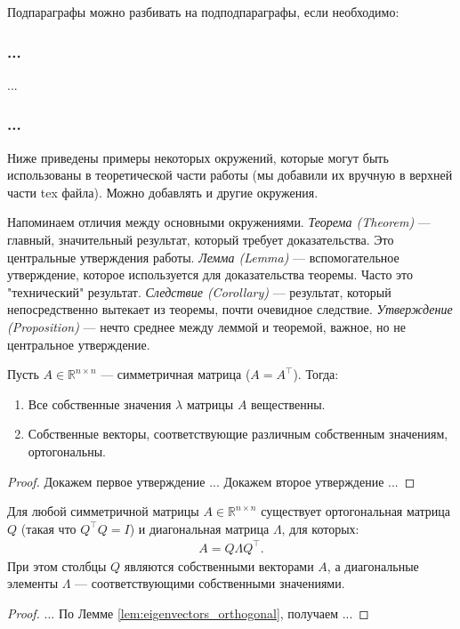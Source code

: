 \documentclass[a4paper,12pt]{article}
\begin{document}
Подпараграфы можно разбивать на подподпараграфы, если необходимо:
\subsubsection{...}

...

\subsubsection{...}

Ниже приведены примеры некоторых окружений, которые могут быть использованы в теоретической части работы (мы добавили их вручную в верхней части tex файла). Можно добавлять и другие окружения.

Напоминаем отличия между основными окружениями. \textit{Теорема (Theorem)} — главный, значительный результат, который требует доказательства. Это центральные утверждения работы.
\textit{Лемма (Lemma)} — вспомогательное утверждение, которое используется для доказательства теоремы. Часто это "технический"  результат.
\textit{Следствие (Corollary)} — результат, который непосредственно вытекает из теоремы, почти очевидное следствие.
\textit{Утверждение (Proposition)} — нечто среднее между леммой и теоремой, важное, но не центральное утверждение.



\begin{lemma}\label{lem:eigenvectors_orthogonal}
    Пусть $A \in \mathbb{R}^{n \times n}$ — симметричная матрица ($A = A^\top$). Тогда:
    \begin{enumerate}
        \item Все собственные значения $\lambda$ матрицы $A$ вещественны.
        \item Собственные векторы, соответствующие различным собственным значениям, ортогональны.
    \end{enumerate}
\end{lemma}

\begin{proof}
    Докажем первое утверждение ... Докажем второе утверждение ...
\end{proof}

\begin{theorem}\label{thm:spectral}
    Для любой симметричной матрицы $A \in \mathbb{R}^{n \times n}$ существует ортогональная матрица $Q$ (такая что $Q^\top Q = I$) и диагональная матрица $\Lambda$, для которых:
    \begin{eqnarray}
        A = Q \Lambda Q^\top.
    \end{eqnarray}
    При этом столбцы $Q$ являются собственными векторами $A$, а диагональные элементы $\Lambda$ — соответствующими собственными значениями.
\end{theorem}
\begin{proof}
    ... По Лемме \ref{lem:eigenvectors_orthogonal}, получаем ...
\end{proof}
\end{document}
